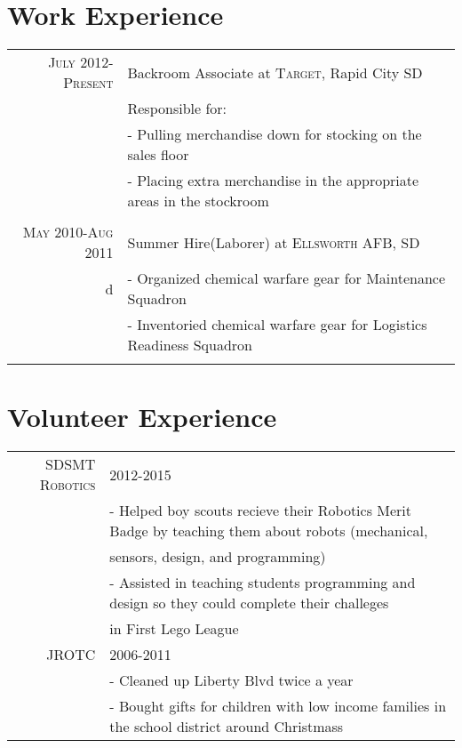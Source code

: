 \documentclass[10pt,a4paper]{article} %
\begin{document}
\section{Work Experience}

\begin{tabular}{r|p{11cm}}
\textsc{July 2012-Present} & Backroom Associate at \textsc{Target}, Rapid City SD \emph{}\\ 
& \footnotesize{Responsible for:}\\
& \footnotesize{ - Pulling merchandise down for stocking on the sales floor} \\
& \footnotesize{ - Placing extra merchandise in the appropriate areas in the stockroom} \\
\multicolumn{2}{c}{} \\
\textsc{May 2010-Aug 2011} & Summer Hire(Laborer) at \textsc{Ellsworth AFB}, SD \emph{}\\ 
d& \footnotesize{- Organized chemical warfare gear for Maintenance Squadron} \\
& \footnotesize{- Inventoried chemical warfare gear for Logistics Readiness Squadron} \\
\multicolumn{2}{c}{} \\
\end{tabular}


\section{Volunteer Experience}

\begin{tabular}{rl}
\textsc{SDSMT Robotics} & 2012-2015 \\ 
& \footnotesize{- Helped boy scouts recieve their Robotics Merit Badge by teaching them about robots (mechanical, }\\
& \footnotesize{sensors, design, and programming)} \\
& \footnotesize{- Assisted in teaching students programming and design so they could complete their challeges }\\
& \footnotesize{in First Lego League }\\
\textsc{JROTC} & 2006-2011 \\
& \footnotesize{- Cleaned up Liberty Blvd twice a year}\\
& \footnotesize{- Bought gifts for children with low income families in the school district around Christmass}\\
\end{tabular}
\end{document}
